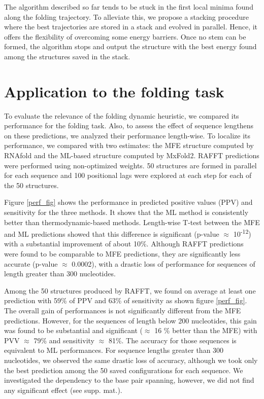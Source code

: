 \documentclass[a4paper,12pt]{article}
\begin{document}
{{The algorithm described so far tends to be stuck in the first local minima found
along the folding trajectory. To alleviate this, we propose a stacking procedure
where the best trajectories are stored in a stack and evolved in parallel.
Hence, it offers the flexibility of overcoming some energy barriers. Once no
stem can be formed, the algorithm stops and output the structure with the best
energy found among the structures saved in the stack.

\section*{Application to the folding task}
\label{sec:orgbf52117}
To evaluate the relevance of the folding dynamic heuristic, we compared its
performance for the folding task. Also, to assess the effect of sequence
lengthens on these predictions, we analyzed their performance length-wise. To
localize its performance, we compared with two estimates: the MFE structure
computed by RNAfold and the ML-based structure computed by MxFold2. RAFFT
predictions were performed using non-optimized weights. 50 structures are formed
in parallel for each sequence and 100 positional lags were explored at each step
for each of the 50 structures.

Figure \ref{perf_fig} shows the performance in predicted positive values (PPV) and
sensitivity for the three methods. It shows that the ML method is consistently
better than thermodynamic-based methods. Length-wise T-test between the MFE and
ML predictions showed that this difference is significant (p-value \(\approx\)
10\textsuperscript{-12}) with a substantial improvement of about 10\%. Although RAFFT
predictions were found to be comparable to MFE predictions, they are
significantly less accurate (p-value \(\approx\) 0.0002), with a drastic loss of
performance for sequences of length greater than 300 nucleotides.

Among the 50 structures produced by RAFFT, we found on average at least one
prediction with 59\% of PPV and 63\% of sensitivity as shown figure \ref{perf_fig}.
The overall gain of performances is not significantly different from the MFE
predictions. However, for the sequences of length below 200 nucleotides, this
gain was found to be substantial and significant (\(\approx\) 16 \% better than the
MFE) with PVV \(\approx\) 79\% and sensitivity \(\approx\) 81\%. The accuracy for those
sequences is equivalent to ML performances. For sequence lengths greater than
300 nucleotides, we observed the same drastic loss of accuracy, although we took
only the best prediction among the 50 saved configurations for each sequence. We
investigated the dependency to the base pair spanning, however, we did not find
any significant effect (see supp. mat.).

}}
\end{document}
